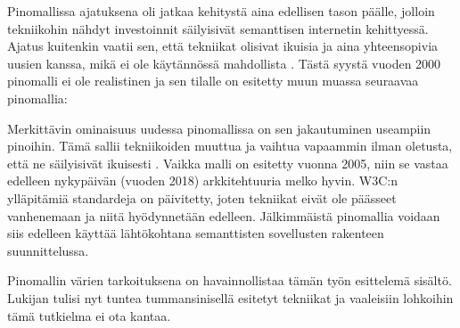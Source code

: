 \documentclass[finnish, 12pt, a4paper, elec, utf8, pdfa, online]{aaltothesis}
\begin{document}
{Pinomallissa ajatuksena oli jatkaa kehitystä aina edellisen tason päälle, jolloin tekniikohin nähdyt investoinnit säilyisivät semanttisen internetin kehittyessä. Ajatus kuitenkin vaatii sen, että tekniikat olisivat ikuisia ja aina yhteensopivia uusien kanssa, mikä ei ole käytännössä mahdollista \cite{stack}. Tästä syystä vuoden 2000 pinomalli ei ole realistinen ja sen tilalle on esitetty muun muassa seuraavaa pinomallia:

Merkittävin ominaisuus uudessa pinomallissa on sen jakautuminen useampiin pinoihin. Tämä sallii tekniikoiden muuttua ja vaihtua vapaammin ilman oletusta, että ne säilyisivät ikuisesti \cite{stack}. Vaikka malli on esitetty vuonna 2005, niin se vastaa edelleen nykypäivän (vuoden 2018) arkkitehtuuria melko hyvin. W3C:n ylläpitämiä standardeja on päivitetty, joten tekniikat eivät ole päässeet vanhenemaan ja niitä hyödynnetään edelleen. Jälkimmäistä pinomallia voidaan siis edelleen käyttää lähtökohtana semanttisten sovellusten rakenteen suunnittelussa.

Pinomallin värien tarkoituksena on havainnollistaa tämän työn esittelemä sisältö. Lukijan tulisi nyt tuntea tummansinisellä esitetyt tekniikat ja vaaleisiin lohkoihin tämä tutkielma ei ota kantaa.

}
\end{document}
